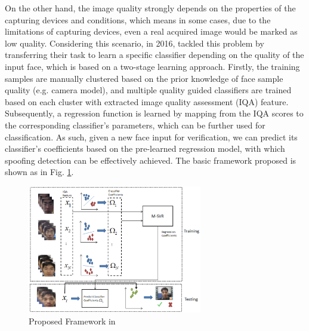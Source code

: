 \documentclass[journal]{IEEEtran}
\begin{document}
On the other hand, the image quality strongly depends on the properties of the capturing devices and conditions, which means in some cases, due to the limitations of capturing devices, even a real acquired image would be marked as low quality. Considering this scenario, in 2016, \cite{li2016face} tackled this problem by transferring their task to learn a specific classifier depending on the quality of the input face, which is based on a two-stage learning approach. Firstly, the training samples are manually clustered based on the prior knowledge of face sample quality (e.g. camera model), and multiple quality guided classifiers are trained based on each cluster with extracted image quality assessment (IQA) feature. Subsequently, a regression function is learned by mapping from the IQA scores to the corresponding classifier’s parameters, which can be further used for classification. As such, given a new face input for verification, we can predict its classifier’s coefficients based on the pre-learned regression model, with which spoofing detection can be effectively achieved. The basic framework proposed is shown as in Fig. \ref{fig.b.2.fram}.
\begin{figure}[!t]
\centering
\includegraphics[width=3in]{img/2-B-2-(1).png}
\caption{Proposed Framework in \cite{li2016face}}
\label{fig.b.2.fram}
\end{figure}
\end{document}
